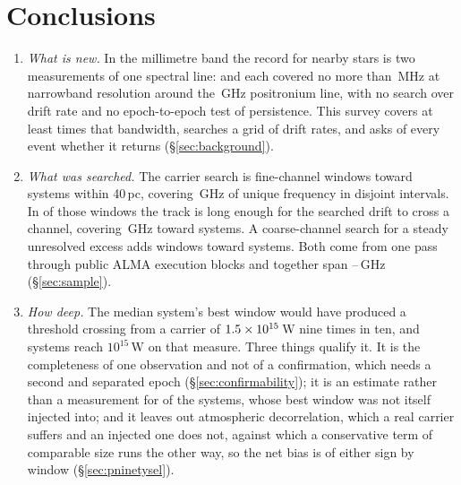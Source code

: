 \section{Conclusions}
\label{sec:conclusions}

\begin{enumerate}[leftmargin=1.6em,itemsep=4pt,topsep=4pt,parsep=0pt]

\item \emph{What is new.} In the millimetre band the record for nearby stars
is two measurements of one spectral line: \citet{Steffes1994} and
\citet{Mauersberger1996} each covered no more than \SbPriorBandMHz\,MHz at
narrowband resolution around the \SbPriorFreqGHz\,GHz positronium line, with
no search over drift rate and
no epoch-to-epoch test of persistence. This survey covers at
least \SbPriorRatio{} times that bandwidth, searches a grid of drift rates,
and asks of every event whether it returns (\S\ref{sec:background}).

\item \emph{What was searched.} The carrier search is \NWinA{} fine-channel
windows toward \NSysClassA{} systems within 40\,pc, covering \CvUnionA\,GHz
of unique frequency in \CovNIslands{} disjoint intervals. In \EdrNWinA{} of
those windows the track is long enough for the searched drift to cross a
channel, covering \EdrUnionGHz\,GHz toward \EdrNSys{} systems. A coarse-channel
search for a steady unresolved excess adds \NWinB{} windows toward
\PrSysClassB{} systems. Both come from one pass through \NEB{} public ALMA
execution blocks and together span \SurvFreqLo--\SurvFreqHi\,GHz
(\S\ref{sec:sample}).

\item \emph{How deep.} The median system's best window would have produced a
threshold crossing from a carrier of $1.5\times10^{15}$\,W nine times in
ten, and \NSysEfifteen{} systems reach $10^{15}$\,W on that measure. Three
things qualify it. It is the completeness of one observation and not of a
confirmation, which needs a second and separated epoch
(\S\ref{sec:confirmability}); it is an estimate rather than a measurement
for \SmcNEstSys{} of the \NSysClassA{} systems, whose best window was not
itself injected into; and it leaves out atmospheric decorrelation, which a
real carrier suffers and an injected one does not, against which a
conservative term of comparable size runs the other way, so the net bias is
of either sign by window (\S\ref{sec:pninetysel}).


\end{enumerate}

